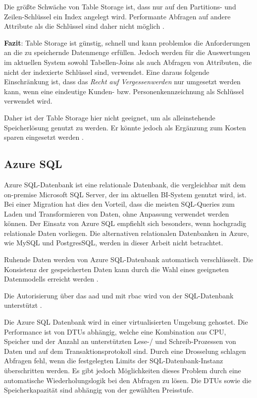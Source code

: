 Die größte Schwäche von Table Storage ist, dass nur auf den Partitions- und Zeilen-Schlüssel ein Index angelegt wird. Performante Abfragen auf andere Attribute als die Schlüssel sind daher nicht möglich \cite{reagan_web_2018}.

\textbf{Fazit}: Table Storage ist günstig, schnell und kann problemlos die Anforderungen an die zu speichernde Datenmenge erfüllen. Jedoch werden für die Auswertungen im aktuellen System sowohl Tabellen-Joins als auch Abfragen von Attributen, die nicht der indexierte Schlüssel sind, verwendet. Eine daraus folgende Einschränkung ist, dass das \textit{Recht auf Vergessenwerden} nur umgesetzt werden kann, wenn eine eindeutige Kunden- bzw. Personenkennzeichnung als Schlüssel verwendet wird.

Daher ist der Table Storage hier nicht geeignet, um als alleinstehende Speicherlösung genutzt zu werden. Er könnte jedoch als Ergänzung zum Kosten sparen eingesetzt werden \cite[vgl.][]{reagan_web_2018}. 

\subsection{Azure SQL} \label{sec:grundlagen:azure_dienste:sql} %
Azure SQL-Datenbank ist eine relationale Datenbank, die vergleichbar mit dem on-premise Microsoft SQL Server, der im aktuellen BI-System genutzt wird, ist. Bei einer Migration hat dies den Vorteil, dass die meisten SQL-Queries zum Laden und Transformieren von Daten, ohne Anpassung verwendet werden können. Der Einsatz von Azure SQL empfiehlt sich besonders, wenn hochgradig relationale Daten vorliegen. Die alternativen relationalen Datenbanken in Azure, wie MySQL und PostgresSQL, werden in dieser Arbeit nicht betrachtet.

Ruhende Daten werden von Azure SQL-Datenbank automatisch verschlüsselt. Die Konsistenz der gespeicherten Daten kann durch die Wahl eines geeigneten Datenmodells erreicht werden \cite{reagan_web_2018}.

Die Autorisierung über das \ac{aad} und mit \ac{rbac} wird von der SQL-Datenbank unterstützt \cite{wolter_authorize_2021}.

Die Azure SQL Datenbank wird in einer virtualisierten Umgebung gehostet. Die Performance ist von DTUs abhängig, welche eine Kombination aus CPU, Speicher und der Anzahl an unterstützten Lese-/ und Schreib-Prozessen von Daten und auf dem Transaktionsprotokoll sind. Durch eine Drosselung schlagen Abfragen fehl, wenn die festgelegten Limits der SQL-Datenbank-Instanz überschritten werden. Es gibt jedoch Möglichkeiten dieses Problem durch eine automatische Wiederholungslogik bei den Abfragen zu lösen. Die DTUs sowie die Speicherkapazität sind abhängig von der gewählten Preisstufe.

